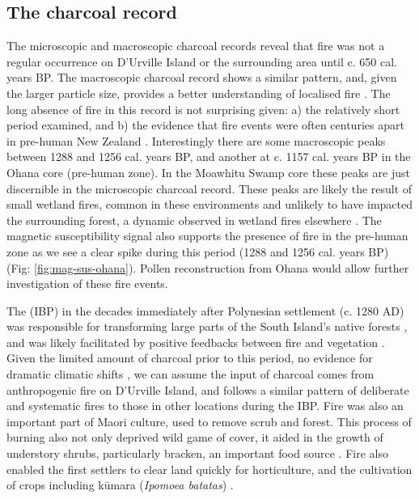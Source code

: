 \documentclass{article}
\begin{document}
\subsection{The charcoal record}

The microscopic and macroscopic charcoal records reveal that fire was not a regular occurrence on D'Urville Island or the surrounding area until c. 650 cal. years BP. The macroscopic charcoal record shows a similar pattern, and, given the larger particle size, provides a better understanding of localised fire \citep{leys2013}.  The long absence of fire in this record is not surprising given: a) the relatively short period examined, and b) the evidence that fire events were often centuries apart in pre-human New Zealand \citep{OgdenJ,McGlone1998,McGlone1999,Wardle2001}.  Interestingly there are some macroscopic peaks between 1288 and 1256 cal. years BP, and another at c. 1157 cal. years BP in the Ohana core (pre-human zone).  In the Moawhitu Swamp core these peaks are just discernible in the microscopic charcoal record.  These peaks are likely the result of small wetland fires, common in these environments and unlikely to have impacted the surrounding forest, a dynamic observed in wetland fires elsewhere \citep{mcglone1984vegetation}.  The magnetic susceptibility signal also supports the presence of fire in the pre-human zone as we see a clear spike during this period (1288 and 1256 cal. years BP) (Fig: \ref{fig:mag-sus-ohana}).  Pollen reconstruction from Ohana would allow further investigation of these fire events. 

The  (IBP) in the decades immediately after Polynesian settlement (c. 1280 AD) was responsible for transforming large parts of the South Island's native forests  \citep{McWethy2009a}, and was likely facilitated by positive feedbacks between fire and vegetation \citep{perry2015exotic}.   Given the limited amount of charcoal prior to this period, no evidence for dramatic climatic shifts \citep{McWethy2009a}, we can assume the input of charcoal comes from anthropogenic fire on D'Urville Island, and follows a similar pattern of deliberate  and systematic fires to those in other locations during the IBP.  Fire was also an important part of Maori culture, used to remove scrub and forest\citep{grace2015}.  This process of burning also not only deprived wild game of cover, it aided in the growth of understory shrubs, particularly bracken, an important food source \citep{guild2009history,Wilmshurst2005}.  Fire also enabled the first settlers to clear land quickly for horticulture, and the cultivation of crops including k\=umara (\textit{Ipomoea batatas}) \citep{simmons1969economic}.           
\end{document}
